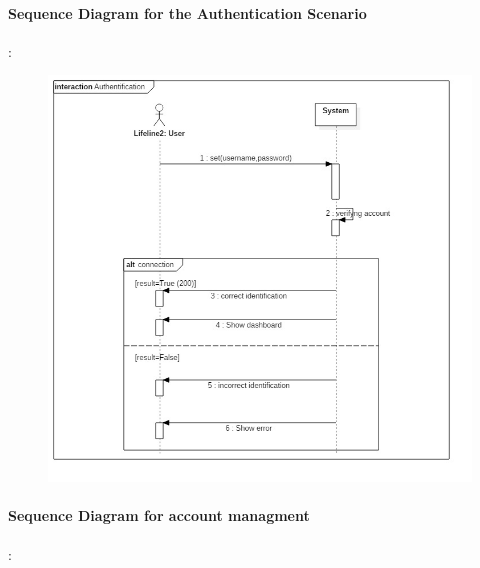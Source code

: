 \paragraph{Sequence Diagram for the Authentication Scenario} :
\label{sec:sec01}

 \begin{figure}[H]
	\centering
	\includegraphics[height=0.7\textheight]{fig01/SequenceDiagramAuthentification}
	\label{fig:FilialesEtClients}
\end{figure}

\paragraph{Sequence Diagram for account managment} :
\label{sec:sec01}

